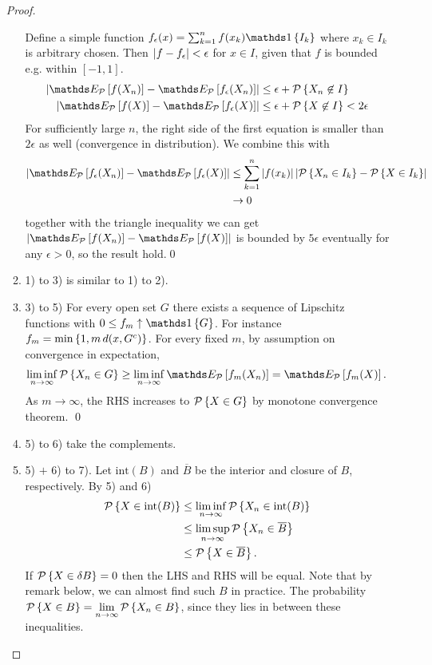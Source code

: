 \documentclass[11pt]{article}
\begin{document}
\begin{itemize}
\begin{proof}
\begin{enumerate}
Define a simple function $f_{\epsilon}(x) = \sum_{k=1}^{n}f(x_{k}) \ind{I_{k}} $ where $x_{k}\in I_{k}$ is arbitrary chosen. Then $\left\lvert f - f_{\epsilon} \right\rvert<\epsilon$ for $x\in I$, given that $f$ is bounded e.g. within $[-1,1]$.
\begin{align*}
\abs{\E{\cP}{f(X_{n})} - \E{\cP}{f_{\epsilon}(X_{n})}} &\le \epsilon + \cP\set{X_{n}\not\in I}\\
\abs{\E{\cP}{f(X)} - \E{\cP}{f_{\epsilon}(X)}} &\le \epsilon + \cP\set{X\not\in I}<2\epsilon
\end{align*}
For sufficiently large $n$, the right side of the first equation is smaller than $2\epsilon$ as well (convergence in distribution). We combine this with 
\begin{align*}
\abs{\E{\cP}{f_{\epsilon}(X_{n})} - \E{\cP}{f_{\epsilon}(X)} }&\le \sum_{k=1}^{n}\abs{f(x_{k})}\abs{\cP\set{X_{n}\in I_{k}}- \cP\set{X\in I_{k}}}\\
&\rightarrow 0
\end{align*}  together with the triangle inequality we can get $\abs{\E{\cP}{f(X_{n})} - \E{\cP}{f(X)} }$ is bounded by $5\epsilon$ eventually for any $\epsilon>0$, so the result hold.\qed

\item  1) to 3) is similar to 1) to 2). 

\item 3) to 5) For every open set $G$ there exists a sequence of Lipschitz functions with $0\le f_{m} \uparrow \ind{G}$. For instance $f_{m} = \min\left\{1, m\,d(x, G^{c})\right\}$. For every fixed $m$, by assumption on convergence in expectation,
\begin{align*}
\liminf\limits_{n\rightarrow \infty}\cP\set{X_{n}\in G} &\ge \liminf\limits_{n\rightarrow \infty}\E{\cP}{f_{m}(X_{n})} = \E{\cP}{f_{m}(X)}.
\end{align*} As $m\rightarrow \infty$, the RHS increases to ${\mathcal P}\left\{X\in G\right\}$ by monotone convergence theorem. \qed

\item  5) to 6) take the complements. 

\item  5) $+$ 6) to 7). Let $\text{int}(B)$ and $\overline{B}$ be the interior and closure of $B$, respectively. By 5) and 6)
\begin{align*}
{\mathcal P}\left\{X\in\text{int}(B)  \right\} &\le \liminf\limits_{n\rightarrow \infty}{\mathcal P}\left\{ X_{n}\in \text{int}(B)  \right\}\\
&\le   \limsup\limits_{n\rightarrow \infty}{\mathcal P}\left\{X_{n}\in \overline{B}  \right\} \\
&\le    {\mathcal P}\left\{X \in \overline{B}  \right\}. 
\end{align*}
If ${\mathcal P}\left\{X\in \delta B\right\} = 0$ then the LHS and RHS will be equal. Note that by remark below, we can almost find such $B$ in practice. The probability ${\mathcal P}\left\{X\in B\right\} = \lim\limits_{n\rightarrow \infty}{\mathcal P}\left\{X_{n}\in B\right\}$, since they lies in between these inequalities. 


\end{enumerate}
\end{proof}
\end{itemize}
\end{document}
